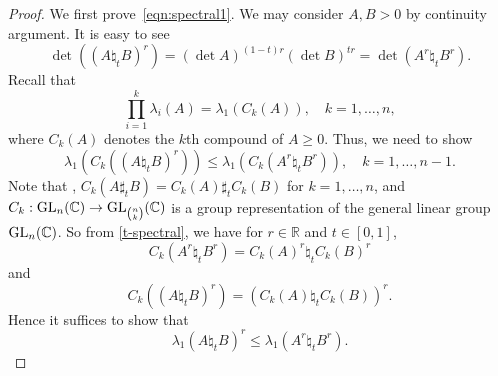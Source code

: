 \documentclass[12pt, reqno]{amsart}
\numberwithin{equation}{section}
\theoremstyle{definition}
\renewcommand{\ge}{\geqslant}
\renewcommand{\le}{\leqslant}
\def\GL{{\rm GL}}
\def\R{\mathbb R}
\def\C{\mathbb C}
\begin{document}
\begin{proof}
We first prove~\eqref{eqn:spectral1}.
We may consider $A, B>0$ by continuity argument.
It is easy to see
\[
\det ((A\natural_t B)^r) = (\det A)^{(1-t)r} (\det B)^{tr} = \det (A^r \natural_t B^r).
\]
Recall \cite[p.776-777]{MOA11}  that 
\begin{equation}\label{E:compound}
\prod_{i=1}^{k}\lambda_i(A)=\lambda_1(C_k(A)),\quad  k=1, \dots, n,
\end{equation}
 where $C_k(A)$ denotes the $k$th compound of $A \ge 0$. Thus, we need to show 
\[
\lambda_1(C_k((A\natural_t B)^r)) \le \lambda_1(C_k(A^r\natural_t B^r)), \quad k=1, \dots, n-1.
\]
Note that \cite [Lemma 1.2]{AH94},  \cite[p.781]{DAT16} $C_k(A\sharp_t B) = C_k(A)\sharp_t C_k(B)$ for $k=1, \dots, n$, and $C_k: \GL_n(\C) \to \GL_{n\choose k}(\C)$ is a group representation of the general linear group $\GL_n(\C)$. So from \eqref{t-spectral}, we have for $r\in \R$ and $t\in[0,1]$,
\begin{equation}\label{E:compound-sharp-r}
C_k(A^r\natural_t B^r) = C_k(A)^r\natural_t C_k(B)^r 
\end{equation}
and 
\[
C_k((A\natural_t B)^r) = (C_k(A)\natural_t C_k(B))^r.
\]
Hence it suffices to show that
\begin{equation}\label{eqn:lambda2}
\lambda_1(A\natural_t B)^r \le \lambda_1(A^r\natural_t B^r).
\end{equation}

\end{proof}
\end{document}
